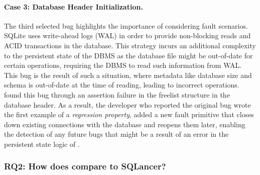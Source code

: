 \paragraph{Case 3: Database Header Initialization.}\label{dirt:case:headerinit}

The third selected bug highlights the importance of considering fault scenarios. SQLite
uses write-ahead logs (WAL) in order to provide non-blocking reads and ACID
transactions in the database. This strategy incurs an additional complexity to the
persistent state of the DBMS as the database file might be out-of-date for certain
operations, requiring the DBMS to read such information from WAL. This bug is the
result of such a situation, where metadata like database size and schema is out-of-date
at the time of reading, leading to incorrect operations. \tool{} found this bug through
an assertion failure in the freelist structure in the database header. As a result, the
developer who reported the original bug wrote the first example of a \emph{regression
  property}, added a new fault primitive  that closes down existing
connections with the database and reopens them later, enabling the detection of any
future bugs that might be a result of an error in the persistent state logic of \db{}.

\subsubsection{RQ2: How does \tool{} compare to SQLancer?}


